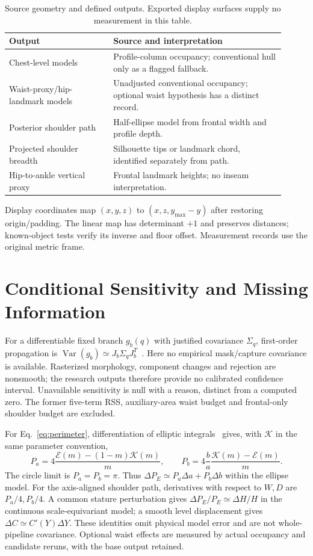 \documentclass[11pt,a4paper]{article}
\begin{document}
\begin{table}[htbp]
\centering
\caption{Source geometry and defined outputs. Exported display surfaces supply no measurement in this table.}
\label{tab:branches}
\small
\begin{tabular}{p{0.34\linewidth}p{0.57\linewidth}}
\toprule
Output & Source and interpretation\\
\midrule
Chest-level models & Profile-column occupancy; conventional hull only as a flagged fallback.\\
Waist-proxy/hip-landmark models & Unadjusted conventional occupancy; optional waist hypothesis has a distinct record.\\
Posterior shoulder path & Half-ellipse model from frontal width and profile depth.\\
Projected shoulder breadth & Silhouette tips or landmark chord, identified separately from path.\\
Hip-to-ankle vertical proxy & Frontal landmark heights; no inseam interpretation.\\
\bottomrule
\end{tabular}
\end{table}

Display coordinates map $(x,y,z)$ to $(x,z,y_{\max}-y)$ after restoring origin/padding. The linear map has determinant $+1$ and preserves distances; known-object tests verify its inverse and floor offset. Measurement records use the original metric frame.

\section{Conditional Sensitivity and Missing Information}
For a differentiable fixed branch $g_b(q)$ with justified covariance $\Sigma_q$, first-order propagation is $\operatorname{Var}(g_b)\simeq J_b\Sigma_qJ_b^T$~\cite{jcgm2008}. Here no empirical mask/capture covariance is available. Rasterized morphology, component changes and rejection are nonsmooth; the research outputs therefore provide no calibrated confidence interval. Unavailable sensitivity is null with a reason, distinct from a computed zero. The former five-term RSS, auxiliary-area waist budget and frontal-only shoulder budget are excluded.

For Eq.~\eqref{eq:perimeter}, differentiation of elliptic integrals~\cite{dlmfelliptic} gives, with $\mathcal K$ in the same parameter convention,
\begin{equation}
 P_a=4\frac{\mathcal E(m)-(1-m)\mathcal K(m)}m,\qquad
 P_b=4\frac{b}{a}\frac{\mathcal K(m)-\mathcal E(m)}m.
 \label{eq:derivative}
\end{equation}
The circle limit is $P_a=P_b=\pi$. Thus $\Delta P_E\simeq P_a\Delta a+P_b\Delta b$ within the ellipse model. For the axis-aligned shoulder path, derivatives with respect to $W,D$ are $P_a/4,P_b/4$. A common stature perturbation gives $\Delta P_E/P_E\simeq\Delta H/H$ in the continuous scale-equivariant model; a smooth level displacement gives $\Delta C\simeq C'(Y)\Delta Y$. These identities omit physical model error and are not whole-pipeline covariance. Optional waist effects are measured by actual occupancy and candidate reruns, with the base output retained.
\end{document}
